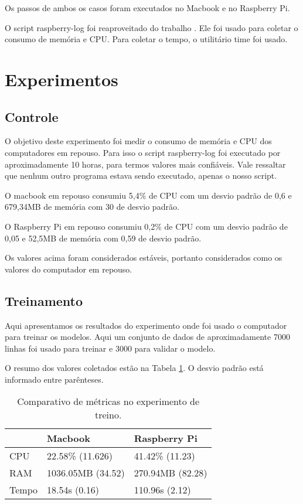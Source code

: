Os passos de ambos os casos foram executados no Macbook e no Raspberry Pi.

O script raspberry-log foi reaproveitado do trabalho \cite{tcc:lucas}. Ele foi usado para 
coletar o consumo de memória e CPU. Para coletar o tempo, o utilitário time 
foi usado.


\section{Experimentos}

\subsection{Controle}

O objetivo deste experimento foi medir o consumo de memória e CPU dos computadores
em repouso. Para isso o script raspberry-log foi executado por aproximadamente 10 horas, 
para termos valores mais confiáveis. Vale ressaltar que nenhum outro programa estava sendo 
executado, apenas o nosso script.

O macbook em repouso consumiu 5,4\% de CPU com um desvio padrão de 0,6 
e 679,34MB de memória com 30 de desvio padrão.

O Raspberry Pi em repouso consumiu 0,2\% de CPU com um desvio padrão de 0,05 
e 52,5MB de memória com 0,59 de desvio padrão. 

Os valores acima foram considerados estáveis, portanto considerados como os valores
do computador em repouso.



\subsection{Treinamento}

Aqui apresentamos os resultados do experimento onde foi usado o computador para treinar os
modelos. Aqui um conjunto de dados de aproximadamente 7000 linhas foi 
usado para treinar e 3000 para validar o modelo.

O resumo dos valores coletados estão na Tabela \ref{tab:comparativo_treino}. O desvio 
padrão está informado entre parênteses.

\begin{table}[!ht]
    \centering
    \begin{tabular}{|l|l|l|}
    \hline
        ~ & Macbook & Raspberry Pi \\ \hline
        CPU & 22.58\% (11.626) & 41.42\% (11.23) \\ \hline
        RAM & 1036.05MB (34.52) & 270.94MB (82.28) \\ \hline
        Tempo & 18.54s (0.16) & 110.96s (2.12) \\ \hline
    \end{tabular}

    \caption{Comparativo de métricas no experimento de treino.\label{tab:comparativo_treino}}
\end{table}

